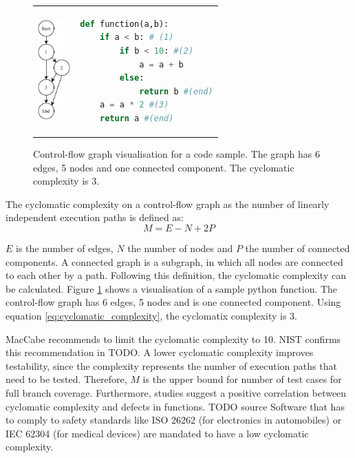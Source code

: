 \begin{figure}
\begin{tabular}{p{}p{}}
    \begin{minipage}{0.45\textwidth}
        \centering
    \includegraphics[height=1.5in]{img/Background/control-flow-graph.pdf}
    \label{fig:background_control_flow_graph_image}
    \end{minipage}
&
\begin{minipage}[c]{0.45\textwidth}
\centering
\begin{lstlisting}[language=Python, label=lst:background_control_flow_graph_listing]
def function(a,b):
    if a < b: # (1)
        if b < 10: #(2)
            a = a + b
        else:
            return b #(end)
    a = a * 2 #(3)
    return a #(end)
\end{lstlisting}
\end{minipage}
\end{tabular}
\caption[Control-flow graph visualisation for a code sample]{Control-flow graph visualisation for a code sample. The graph has 6 edges, 5 nodes and one connected component. The cyclomatic complexity is 3. }
\label{fig:background_control_flow_graph}
\end{figure}

The cyclomatic complexity on a control-flow graph as the number of linearly independent execution paths is defined as:
\begin{equation}\label{eq:cyclomatic_complexity}
M = E - N + 2P
\end{equation}

$E$ is the number of edges, $N$ the number of nodes and $P$ the number of connected components.  A connected graph is a subgraph, in which all nodes are connected to each other by a path. Following this definition, the cyclomatic complexity can be calculated. Figure \ref{fig:background_control_flow_graph} shows a visualisation of a sample python function. The control-flow graph has 6 edges, 5 nodes and is one connected component. Using equation \ref{eq:cyclomatic_complexity}, the cyclomatix complexity is 3.

MacCabe recommends to limit the cyclomatic complexity to 10. NIST confirms this recommendation in TODO. A lower cyclomatic complexity improves testability, since the complexity represents the number of execution paths that need to be tested. Therefore, $M$ is the upper bound for number of test cases for full branch coverage. 
Furthermore, studies suggest a positive correlation between cyclomatic complexity and defects in functions. TODO source
Software that has to comply to safety standards like ISO 26262 (for electronics in automobiles) or IEC 62304 (for medical devices) are mandated to have a low cyclomatic complexity\cite{isotc_22sc_32_iso_2018, isotisotc_210_iec_2006c_210}.

